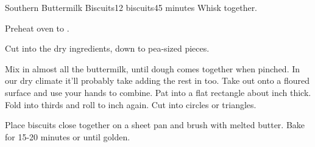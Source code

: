 \documentclass[../Cookbook.tex]{subfiles}
\begin{document}
\begin{recipe}[SouthernButtermilkBiscuits]{Southern Buttermilk Biscuits}{12 biscuits}{45 minutes}
Whisk together.

Preheat oven to .

Cut into the dry ingredients, down to pea-sized pieces.

Mix in almost all the buttermilk, until dough comes together when pinched.
In our dry climate it'll probably take adding the rest in too.
Take out onto a floured surface and use your hands to combine.
Pat into a flat rectangle about  inch thick.
Fold into thirds and roll to  inch again.
Cut into circles or triangles.

Place biscuits close together on a sheet pan and brush with melted butter.
Bake for 15-20 minutes or until golden.

\end{recipe}
\end{document}
